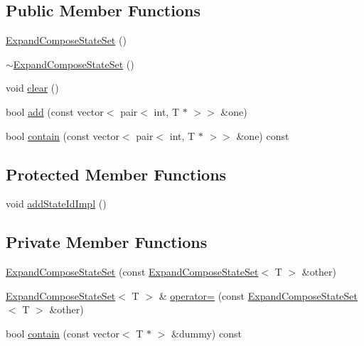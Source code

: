 \subsection*{Public Member Functions}
\begin{DoxyCompactItemize}
\item 
\mbox{\hyperlink{classgraphsat_1_1_expand_compose_state_set_a81cb6c2632c0282fad861ed5401df3df}{Expand\+Compose\+State\+Set}} ()
\item 
\mbox{\hyperlink{classgraphsat_1_1_expand_compose_state_set_a393b8b91725f39cbad5e1b3e0102f85a}{$\sim$\+Expand\+Compose\+State\+Set}} ()
\item 
void \mbox{\hyperlink{classgraphsat_1_1_expand_compose_state_set_a4478c7c058e694b717db1fe820614f0a}{clear}} ()
\item 
bool \mbox{\hyperlink{classgraphsat_1_1_expand_compose_state_set_ad56d86ce711a4586fcdaacc7e94d4e18}{add}} (const vector$<$ pair$<$ int, T $\ast$ $>$$>$ \&one)
\item 
bool \mbox{\hyperlink{classgraphsat_1_1_expand_compose_state_set_a4c014106669978321e07e0c9b7783479}{contain}} (const vector$<$ pair$<$ int, T $\ast$ $>$$>$ \&one) const
\end{DoxyCompactItemize}
\subsection*{Protected Member Functions}
\begin{DoxyCompactItemize}
\item 
void \mbox{\hyperlink{classgraphsat_1_1_expand_compose_state_set_a96584eb485af3dfc9b0115e4d953eb61}{add\+State\+Id\+Impl}} ()
\end{DoxyCompactItemize}
\subsection*{Private Member Functions}
\begin{DoxyCompactItemize}
\item 
\mbox{\hyperlink{classgraphsat_1_1_expand_compose_state_set_a1aa9eef8b8e33938b367af8e20b305e1}{Expand\+Compose\+State\+Set}} (const \mbox{\hyperlink{classgraphsat_1_1_expand_compose_state_set}{Expand\+Compose\+State\+Set}}$<$ T $>$ \&other)
\item 
\mbox{\hyperlink{classgraphsat_1_1_expand_compose_state_set}{Expand\+Compose\+State\+Set}}$<$ T $>$ \& \mbox{\hyperlink{classgraphsat_1_1_expand_compose_state_set_a4aca81b4114f9721755ef068fd7ff9d5}{operator=}} (const \mbox{\hyperlink{classgraphsat_1_1_expand_compose_state_set}{Expand\+Compose\+State\+Set}}$<$ T $>$ \&other)
\item 
bool \mbox{\hyperlink{classgraphsat_1_1_expand_compose_state_set_a5a2ee34354897e737fff3162fd25d791}{contain}} (const vector$<$ T $\ast$ $>$ \&dummy) const
\end{DoxyCompactItemize}
